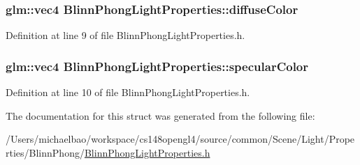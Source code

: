 \subsubsection[{diffuse\+Color}]{\setlength{\rightskip}{0pt plus 5cm}glm\+::vec4 Blinn\+Phong\+Light\+Properties\+::diffuse\+Color}\label{struct_blinn_phong_light_properties_aa12c81d848d370b8f79c9384d9fafec0}


Definition at line 9 of file Blinn\+Phong\+Light\+Properties.\+h.

\hypertarget{struct_blinn_phong_light_properties_a815238c4f235333affb85f949ff8df06}{}
\subsubsection[{specular\+Color}]{\setlength{\rightskip}{0pt plus 5cm}glm\+::vec4 Blinn\+Phong\+Light\+Properties\+::specular\+Color}\label{struct_blinn_phong_light_properties_a815238c4f235333affb85f949ff8df06}


Definition at line 10 of file Blinn\+Phong\+Light\+Properties.\+h.



The documentation for this struct was generated from the following file\+:\begin{DoxyCompactItemize}
\item 
/\+Users/michaelbao/workspace/cs148opengl4/source/common/\+Scene/\+Light/\+Properties/\+Blinn\+Phong/\hyperlink{_blinn_phong_light_properties_8h}{Blinn\+Phong\+Light\+Properties.\+h}\end{DoxyCompactItemize}
